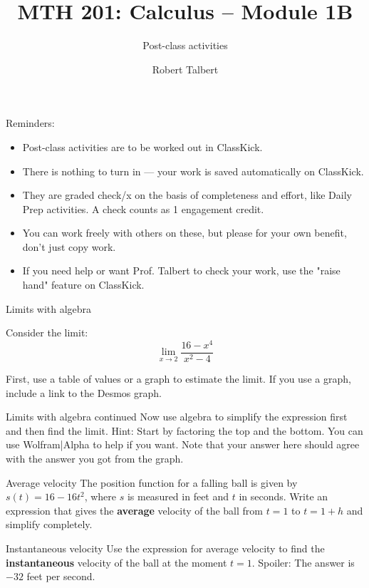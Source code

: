 \documentclass[10pt]{beamer}
\title{MTH 201: Calculus -- Module 1B}
\subtitle{Post-class activities}
\date{}
\author{Robert Talbert}
\institute{Grand Valley State University}
\begin{document}
\maketitle

\begin{frame}{Reminders:}

\begin{itemize}
    \item Post-class activities are to be worked out in ClassKick.
    \item There is nothing to turn in --- your work is saved automatically on ClassKick. 
    \item They are graded check/x on the basis of completeness and effort, like Daily Prep activities. A check counts as 1 engagement credit. 
    \item You can work freely with others on these, but please for your own benefit, don't just copy work. 
    \item If you need help or want Prof. Talbert to check your work, use the "raise hand" feature on ClassKick. 
\end{itemize}

\end{frame}

\begin{frame}[t]{Limits with algebra}

Consider the limit: 
$$\lim_{x \to 2} \frac{16-x^4}{x^2-4}$$

First, use a table of values or a graph to estimate the limit. If you use a graph, include a link to the Desmos graph. 
\end{frame}

\begin{frame}[t]{Limits with algebra continued}
Now use algebra to simplify the expression first and then find the limit. Hint: Start by factoring the top and the bottom. You can use Wolfram|Alpha to help if you want. Note that your answer here should agree with the answer you got from the graph. 
    
\end{frame}

\begin{frame}[t]{Average velocity}
The position function for a falling ball is given by $s(t) = 16 - 16t^2$, where $s$ is measured in feet and $t$ in seconds. Write an expression that gives the \textbf{average} velocity of the ball from $t=1$ to $t = 1+h$ and simplify completely. 
\end{frame}

\begin{frame}[t]{Instantaneous velocity}
Use the expression for average velocity to find the \textbf{instantaneous} velocity of the ball at the moment $t=1$. Spoiler: The answer is $-32$ feet per second. 
\end{frame}
\end{document}
